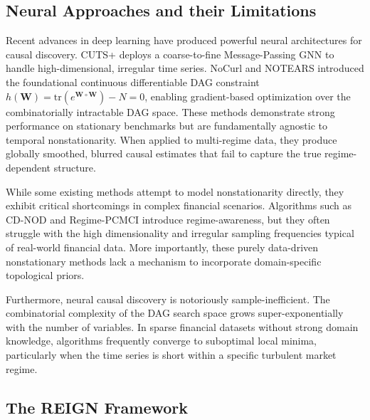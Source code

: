 \subsection{Neural Approaches and their Limitations}

Recent advances in deep learning have produced powerful neural architectures for causal discovery. CUTS+ \cite{Cheng2023} deploys a coarse-to-fine Message-Passing GNN to handle high-dimensional, irregular time series. NoCurl and NOTEARS \cite{Zheng2018} introduced the foundational continuous differentiable DAG constraint $h(\mathbf{W}) = \text{tr}(e^{\mathbf{W} \circ \mathbf{W}}) - N = 0$, enabling gradient-based optimization over the combinatorially intractable DAG space. These methods demonstrate strong performance on stationary benchmarks but are fundamentally agnostic to temporal nonstationarity. When applied to multi-regime data, they produce globally smoothed, blurred causal estimates that fail to capture the true regime-dependent structure.

\begin{revenv}
While some existing methods attempt to model nonstationarity directly, they exhibit critical shortcomings in complex financial scenarios. Algorithms such as CD-NOD \cite{huang2020causal} and Regime-PCMCI \cite{saggioro2020causal} introduce regime-awareness, but they often struggle with the high dimensionality and irregular sampling frequencies typical of real-world financial data. More importantly, these purely data-driven nonstationary methods lack a mechanism to incorporate domain-specific topological priors.

Furthermore, neural causal discovery is notoriously sample-inefficient. The combinatorial complexity of the DAG search space grows super-exponentially with the number of variables. In sparse financial datasets without strong domain knowledge, algorithms frequently converge to suboptimal local minima, particularly when the time series is short within a specific turbulent market regime.
\end{revenv}

\subsection{The REIGN Framework}

